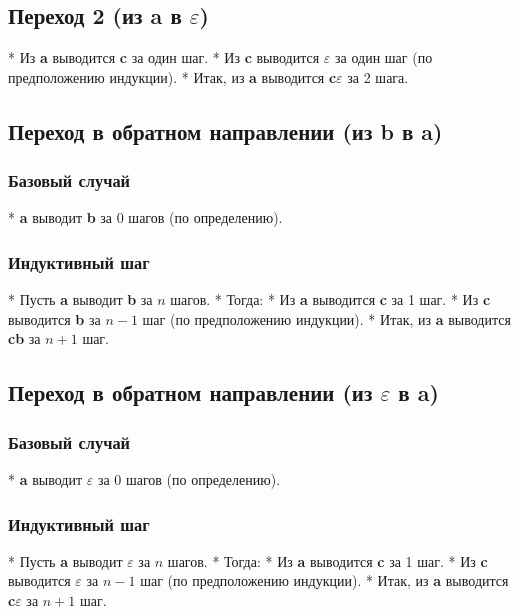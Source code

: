 \documentclass{article}
\begin{document}
\begin{itemize}
\begin{itemize}
\subsection{Переход 2 (из \textbf{a} в $\varepsilon$)}

* Из \textbf{a} выводится \textbf{c} за один шаг.
* Из \textbf{c} выводится $\varepsilon$ за один шаг (по предположению индукции).
* Итак, из \textbf{a} выводится \textbf{c}$\varepsilon$ за 2 шага.

\subsection{Переход в обратном направлении (из \textbf{b} в \textbf{a})}

\subsubsection{Базовый случай}

* \textbf{a} выводит \textbf{b} за 0 шагов (по определению).

\subsubsection{Индуктивный шаг}

* Пусть \textbf{a} выводит \textbf{b} за $n$ шагов.
* Тогда:
    * Из \textbf{a} выводится \textbf{c} за 1 шаг.
    * Из \textbf{c} выводится \textbf{b} за $n-1$ шаг (по предположению индукции).
* Итак, из \textbf{a} выводится \textbf{cb} за $n+1$ шаг.

\subsection{Переход в обратном направлении (из $\varepsilon$ в \textbf{a})}

\subsubsection{Базовый случай}

* \textbf{a} выводит $\varepsilon$ за 0 шагов (по определению).

\subsubsection{Индуктивный шаг}

* Пусть \textbf{a} выводит $\varepsilon$ за $n$ шагов.
* Тогда:
    * Из \textbf{a} выводится \textbf{c} за 1 шаг.
    * Из \textbf{c} выводится $\varepsilon$ за $n-1$ шаг (по предположению индукции).
* Итак, из \textbf{a} выводится \textbf{c}$\varepsilon$ за $n+1$ шаг.

\end{itemize}
\end{itemize}
\end{document}
